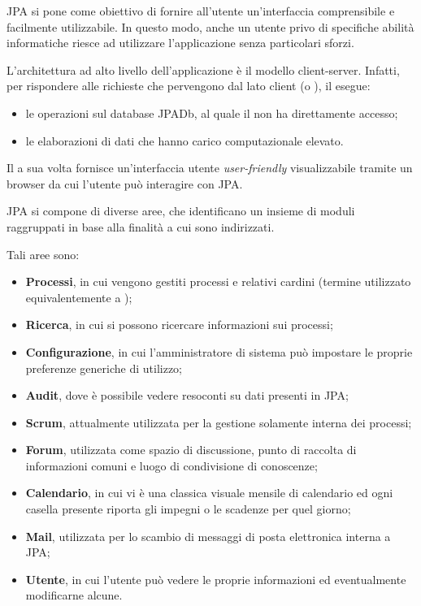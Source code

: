 JPA si pone come obiettivo di fornire all'utente un'interfaccia comprensibile e
facilmente utilizzabile. In questo modo, anche un utente privo di specifiche
abilità informatiche riesce ad utilizzare l'applicazione senza particolari
sforzi.

L'architettura ad alto livello dell'applicazione è il modello client-server.
Infatti, per rispondere alle richieste che pervengono dal lato client (o
\FREND{}), il \BKEND{} esegue:

\begin{itemize}
	\item le operazioni  sul database JPADb, al quale il \FREND{} non
	ha direttamente accesso;
	\item le elaborazioni di dati che hanno carico computazionale elevato.
\end{itemize}

Il \FREND{} a sua volta fornisce un'interfaccia utente \emph{user-friendly}
visualizzabile tramite un browser da cui l'utente può interagire con JPA.

JPA si compone di diverse aree, che identificano un insieme di moduli
raggruppati in base alla finalità a cui sono indirizzati.

Tali aree sono:

\begin{itemize}
	\item \textbf{Processi}, in cui vengono gestiti processi e relativi cardini
	(termine utilizzato equivalentemente a );
	\item \textbf{Ricerca}, in cui si possono ricercare informazioni sui
	processi;
	\item \textbf{Configurazione}, in cui l'amministratore di sistema può
	impostare le proprie preferenze generiche di utilizzo;
	\item \textbf{Audit}, dove è possibile vedere resoconti su dati presenti in
	JPA;
	\item \textbf{Scrum}, attualmente utilizzata per la gestione solamente
	interna dei processi;
	\item \textbf{Forum}, utilizzata come spazio di discussione, punto di
	raccolta di informazioni comuni e luogo di condivisione di conoscenze;
	\item \textbf{Calendario}, in cui vi è una classica visuale mensile di
	calendario ed ogni casella presente riporta gli impegni o le scadenze per
	quel giorno;
	\item \textbf{Mail}, utilizzata per lo scambio di messaggi di posta
	elettronica interna a JPA;
	\item \textbf{Utente}, in cui l'utente può vedere le proprie informazioni ed
	eventualmente modificarne alcune.
\end{itemize}

